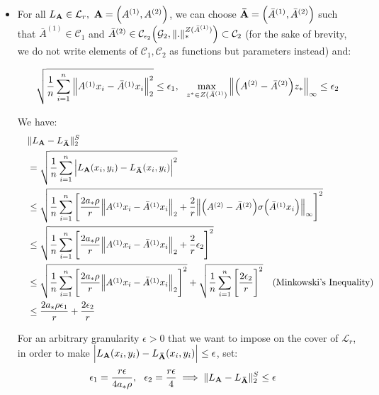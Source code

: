 \begin{itemize}
    \item For all $L_\vecbf{A}\in\mathcal{L}_r, \ \vecbf{A}=\Big(A^{(1)}, A^{(2)}\Big)$, we can choose ${\bf \bar A}=\Big( \bar A^{(1)}, \bar A^{(2)} \Big)$ such that $\bar A^{(1)} \in \mathcal{C}_1$ and $\bar A^{(2)} \in \mathcal{C}_{\epsilon_2}\Big( \mathcal{G}_2, \|.\|_*^{Z(\bar A^{(1)})} \Big)\subset\mathcal{C}_2$ (for the sake of brevity, we do not write elements of $\mathcal{C}_1, \mathcal{C}_2$ as functions but parameters instead) and:

    \begin{align*}
        \sqrt{
            \frac{1}{n} \sum_{i=1}^n \Big\|
                A^{(1)}x_i - \bar A^{(1)}x_i
            \Big\|_2^2 
        } \le \epsilon_1, \ \
        \max_{z^* \in Z(\bar A^{(1)})} \Big\| \Big( A^{(2)} - \bar A^{(2)} \Big)z_* \Big\|_\infty \le \epsilon_2
    \end{align*}

    We have:
    \begin{align*}
        &\|L_{\bf A} - L_{\bf \bar A}\|_2^S \\
        \ \ \ &= 
        \sqrt{\frac{1}{n}\sum_{i=1}^n\Big| 
            L_{\bf A}(x_i, y_i) - L_{\bf \bar A}(x_i, y_i) 
         \Big|^2} \\
        &\le \sqrt{
            \frac{1}{n}\sum_{i=1}^n
            \Bigg[ 
                \frac{2a_*\rho}{r} \Big\|A^{(1)}x_i - \bar A^{(1)}x_i\Big\|_2 + \frac{2}{r}\Big\| \Big( 
                    A^{(2)} - \bar A^{(2)}
                 \Big)\sigma\Big( \bar A^{(1)}x_i \Big) \Big\|_\infty
             \Bigg]^2
        } \\
        &\le \sqrt{
            \frac{1}{n}\sum_{i=1}^n
            \Bigg[ 
                \frac{2a_*\rho}{r} \Big\|A^{(1)}x_i - \bar A^{(1)}x_i\Big\|_2 + \frac{2}{r}\epsilon_2
             \Bigg]^2
        } \\
        &\le \sqrt{
            \frac{1}{n}\sum_{i=1}^n \Bigg[ 
                \frac{2a_*\rho}{r} \Big\| 
                    A^{(1)}x_i - \bar A^{(1)}x_i
                \Big\|_2
             \Bigg]^2
        } + \sqrt{
            \frac{1}{n}\sum_{i=1}^n\Bigg[ 
                \frac{2\epsilon_2}{r}
             \Bigg]^2
        } \ \ \ \text{(Minkowski's Inequality)} \\
        &\le \frac{2a_*\rho\epsilon_1}{r} + \frac{2\epsilon_2}{r}
    \end{align*}

    \noindent For an arbitrary granularity $\epsilon>0$ that we want to impose on the cover of $\mathcal{L}_r$, in order to make $\Big| L_{\bf A}(x_i, y_i) - L_{\bf \bar A}(x_i, y_i) \Big| \le \epsilon$, set:
    \begin{align*}
        \epsilon_1 &= \frac{r\epsilon}{4a_*\rho}, \ \ \epsilon_2 = \frac{r\epsilon}{4} \implies \|L_{\bf A} - L_{\bf \bar A}\|_2^S \le \epsilon
    \end{align*}


\end{itemize}
